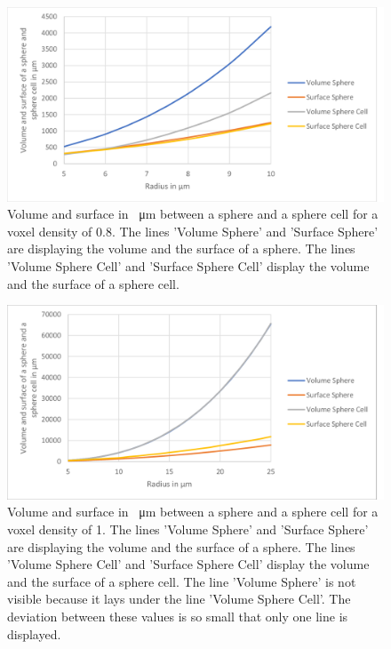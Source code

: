 \begin{figure}[ht]
	\center
	\includegraphics[scale=0.3]{figures/DeviationSphereToPixelSphere-vD0_8.png}
	\caption[Volume and surface in \SI{}{\micro\metre} between a sphere and a sphere cell for a voxel density of 0.8]{Volume and surface in \SI{}{\micro\metre} between a sphere and a sphere cell for a voxel density of 0.8.  The lines 'Volume Sphere' and 'Surface Sphere' are displaying the volume and the surface of a sphere. The lines 'Volume Sphere Cell' and 'Surface Sphere Cell' display the volume and the surface of a sphere cell.}
	\label{img:DeviationSphereCellRealSphere-vD0,8}
\end{figure}

\begin{figure}[ht]
	\center
	\includegraphics[scale=0.3]{figures/DeviationSphereToPixelSphere-vD1.png}
	\caption[Volume and surface in \SI{}{\micro\metre} between a sphere and a sphere cell for a voxel density of 1]{Volume and surface in \SI{}{\micro\metre} between a sphere and a sphere cell for a voxel density of 1.  The lines 'Volume Sphere' and 'Surface Sphere' are displaying the volume and the surface of a sphere. The lines 'Volume Sphere Cell' and 'Surface Sphere Cell' display the volume and the surface of a sphere cell. The line 'Volume Sphere' is not visible because it lays under the line 'Volume Sphere Cell'. The deviation between these values is so small that only one line is displayed.}
	\label{img:DeviationSphereCellRealSphere-vD1}
\end{figure}

